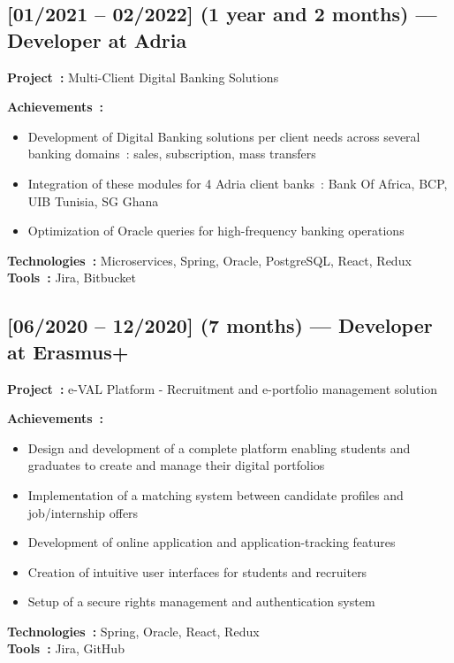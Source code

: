 \subsection*{[01/2021 -- 02/2022] (1 year and 2 months) --- Developer at Adria}
\vspace{4pt}
\textbf{Project~:} Multi-Client Digital Banking Solutions

\textbf{Achievements~:}
\begin{itemize}
    \item Development of Digital Banking solutions per client needs across several banking domains~: sales, subscription, mass transfers
    \item Integration of these modules for 4 Adria client banks~: Bank Of Africa, BCP, UIB Tunisia, SG Ghana
    \item Optimization of Oracle queries for high-frequency banking operations
\end{itemize}
\textbf{Technologies~:} Microservices, Spring, Oracle, PostgreSQL, React, Redux\\
\textbf{Tools~:} Jira, Bitbucket

\subsection*{[06/2020 -- 12/2020] (7 months) --- Developer at Erasmus+}
\vspace{4pt}
\textbf{Project~:} e-VAL Platform - Recruitment and e-portfolio management solution

\textbf{Achievements~:}
\begin{itemize}
    \item Design and development of a complete platform enabling students and graduates to create and manage their digital portfolios
    \item Implementation of a matching system between candidate profiles and job/internship offers
    \item Development of online application and application-tracking features
    \item Creation of intuitive user interfaces for students and recruiters
    \item Setup of a secure rights management and authentication system
\end{itemize}
\textbf{Technologies~:} Spring, Oracle, React, Redux\\
\textbf{Tools~:} Jira, GitHub

